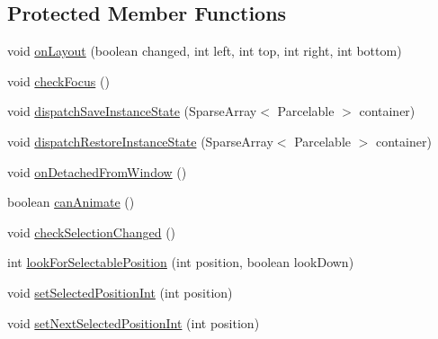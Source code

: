 \subsection*{Protected Member Functions}
\begin{DoxyCompactItemize}
\item 
void \hyperlink{classit_1_1sephiroth_1_1android_1_1library_1_1widget_1_1_adapter_view_a9f032e67732b3e622b53122e367e3ac4}{on\+Layout} (boolean changed, int left, int top, int right, int bottom)
\item 
void \hyperlink{classit_1_1sephiroth_1_1android_1_1library_1_1widget_1_1_adapter_view_aae1abba649fe6603222e86d54559564a}{check\+Focus} ()
\item 
void \hyperlink{classit_1_1sephiroth_1_1android_1_1library_1_1widget_1_1_adapter_view_a1f72eb8b9b167c4a877e1aff90ad8103}{dispatch\+Save\+Instance\+State} (Sparse\+Array$<$ Parcelable $>$ container)
\item 
void \hyperlink{classit_1_1sephiroth_1_1android_1_1library_1_1widget_1_1_adapter_view_a875d6afa475d54021bf9edadbc8e16d8}{dispatch\+Restore\+Instance\+State} (Sparse\+Array$<$ Parcelable $>$ container)
\item 
void \hyperlink{classit_1_1sephiroth_1_1android_1_1library_1_1widget_1_1_adapter_view_a3fa18bf56943a40d22a6fb8fb29f6456}{on\+Detached\+From\+Window} ()
\item 
boolean \hyperlink{classit_1_1sephiroth_1_1android_1_1library_1_1widget_1_1_adapter_view_ab725b070a24128471ad8a4cd1c0e1149}{can\+Animate} ()
\item 
void \hyperlink{classit_1_1sephiroth_1_1android_1_1library_1_1widget_1_1_adapter_view_a1f4603697d5eb3b48877d2c34d550cf5}{check\+Selection\+Changed} ()
\item 
int \hyperlink{classit_1_1sephiroth_1_1android_1_1library_1_1widget_1_1_adapter_view_a5903c15455d85d8a05bcfef8a8d07b58}{look\+For\+Selectable\+Position} (int position, boolean look\+Down)
\item 
void \hyperlink{classit_1_1sephiroth_1_1android_1_1library_1_1widget_1_1_adapter_view_a8701e8cabf4dcdfe6a2f021acf50c718}{set\+Selected\+Position\+Int} (int position)
\item 
void \hyperlink{classit_1_1sephiroth_1_1android_1_1library_1_1widget_1_1_adapter_view_a9154b058c6af8bec3176390bb142e647}{set\+Next\+Selected\+Position\+Int} (int position)
\end{DoxyCompactItemize}
